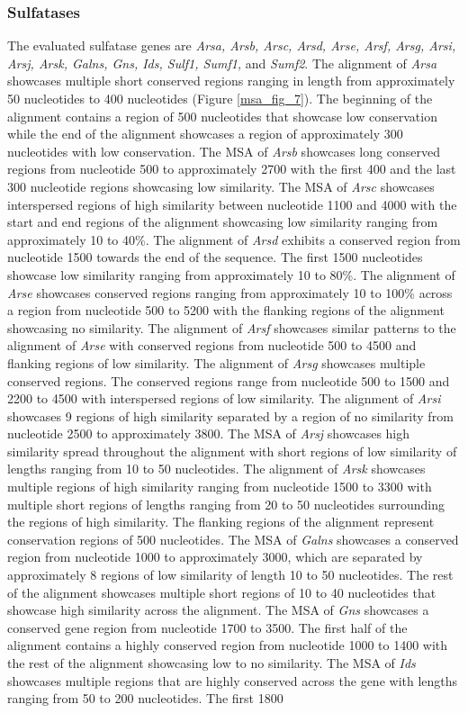 \documentclass{article}
\begin{document}
\subsubsection{Sulfatases}
The evaluated sulfatase genes are \textit{Arsa, Arsb, Arsc, Arsd, Arse, Arsf, Arsg, Arsi, Arsj, Arsk, Galns, Gns, Ids, Sulf1, Sumf1,} and \textit{Sumf2}. The alignment of \textit{Arsa} showcases multiple short conserved regions ranging in length from approximately 50 nucleotides  to 400 nucleotides (Figure \ref{msa_fig_7}). The beginning of the alignment contains a region of 500 nucleotides that showcase low conservation while the end of the alignment showcases a region of approximately 300 nucleotides with low conservation. The MSA of \textit{Arsb} showcases long conserved regions from nucleotide 500 to approximately 2700 with the first 400 and the last 300 nucleotide regions showcasing low similarity. The MSA of \textit{Arsc} showcases interspersed regions of high similarity between nucleotide 1100 and 4000 with the start and end regions of the alignment showcasing low similarity ranging from approximately 10 to 40\%. The alignment of \textit{Arsd} exhibits a conserved region from nucleotide 1500 towards the end of the sequence. The first 1500 nucleotides showcase low similarity ranging from approximately 10 to 80\%. The alignment of \textit{Arse} showcases conserved regions ranging from approximately 10 to 100\% across a region from nucleotide 500 to 5200 with the flanking regions of the alignment showcasing no similarity. The alignment of \textit{Arsf} showcases similar patterns to the alignment of \textit{Arse} with conserved regions from nucleotide 500 to 4500 and flanking regions of low similarity. The alignment of \textit{Arsg} showcases multiple conserved regions. The conserved regions range from nucleotide 500 to 1500 and 2200 to 4500 with interspersed regions of low similarity. The alignment of \textit{Arsi} showcases 9 regions of high similarity separated by a region of no similarity from nucleotide 2500 to approximately 3800. The MSA of \textit{Arsj} showcases high similarity spread throughout the alignment with short regions of low similarity of lengths ranging from 10 to 50 nucleotides. The alignment of \textit{Arsk} showcases multiple regions of high similarity ranging from nucleotide 1500 to 3300 with multiple short regions of lengths ranging from 20 to 50 nucleotides surrounding the regions of high similarity. The flanking regions of the alignment represent conservation regions of 500 nucleotides. The MSA of \textit{Galns} showcases a conserved region from nucleotide 1000 to approximately 3000, which are separated by approximately 8 regions of low similarity of length 10 to 50 nucleotides. The rest of the alignment showcases multiple short regions of 10 to 40 nucleotides that showcase high similarity across the alignment. The MSA of \textit{Gns} showcases a conserved gene region from nucleotide 1700 to 3500. The first half of the alignment contains a highly conserved region from nucleotide 1000 to 1400 with the rest of the alignment showcasing low to no similarity. The MSA of \textit{Ids} showcases multiple regions that are highly conserved across the gene with lengths ranging from 50 to 200 nucleotides. The first 1800 
\end{document}
